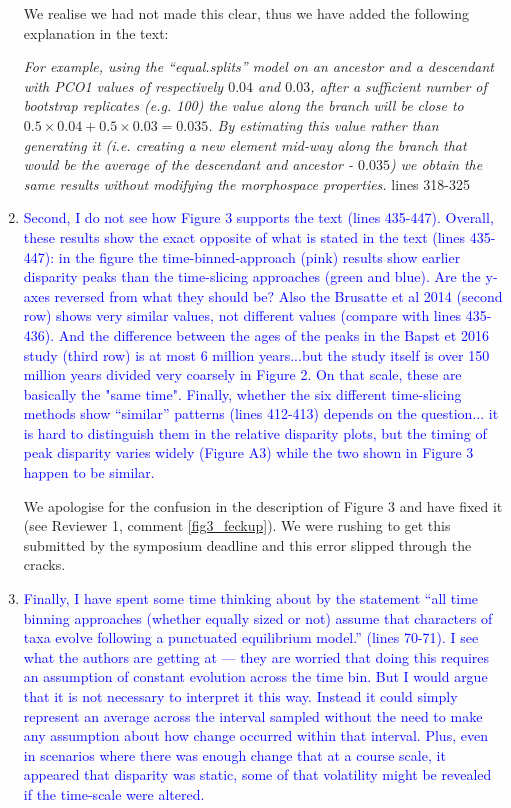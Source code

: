 \documentclass[12pt,letterpaper]{article}
\begin{document}
\begin{enumerate}
We realise we had not made this clear, thus we have added the following explanation in the text:

\textit{For example, using the ``equal.splits'' model on an ancestor and a descendant with PCO1 values of respectively $0.04$ and $0.03$, after a sufficient number of bootstrap replicates (e.g. 100) the value along the branch will be close to $0.5\times0.04 + 0.5\times0.03 = 0.035$.
By estimating this value rather than generating it (i.e. creating a new element mid-way along the branch that would be the average of the descendant and ancestor - $0.035$) we obtain the same results without modifying the morphospace properties.} lines 318-325

\item{\textcolor{blue}{Second, I do not see how Figure 3 supports the text (lines 435-447). Overall, these results show the exact opposite of what is stated in the text (lines 435-447): in the figure the time-binned-approach (pink) results show earlier disparity peaks than the time-slicing approaches (green and blue). Are the y-axes reversed from what they should be? Also the Brusatte et al 2014 (second row) shows very similar values, not different values (compare with lines 435-436). And the difference between the ages of the peaks in the Bapst et 2016 study (third row) is at most 6 million years...but the study itself is over 150 million years divided very coarsely in Figure 2.  On that scale, these are basically the "same time". Finally, whether the six different time-slicing methods show ``similar'' patterns (lines 412-413) depends on the question... it is hard to distinguish them in the relative disparity plots, but the timing of peak disparity varies widely (Figure A3) while the two shown in Figure 3 happen to be similar.}}

We apologise for the confusion in the description of Figure 3 and have fixed it (see Reviewer 1, comment \ref{fig3_feckup}). We were rushing to get this submitted by the symposium deadline and this error slipped through the cracks.

\item{\textcolor{blue}{Finally, I have spent some time thinking about by the statement ``all time binning approaches (whether equally sized or not) assume that characters of taxa evolve following a punctuated equilibrium model.'' (lines 70-71). I see what the authors are getting at — they are worried that doing this requires an assumption of constant evolution across the time bin. But I would argue that it is not necessary to interpret it this way. Instead it could simply represent an average across the interval sampled without the need to make any assumption about how change occurred within that interval. Plus, even in scenarios where there was enough change that at a course scale, it appeared that disparity was static, some of that volatility might be revealed if the time-scale were altered.}}


\end{enumerate}
\end{document}
